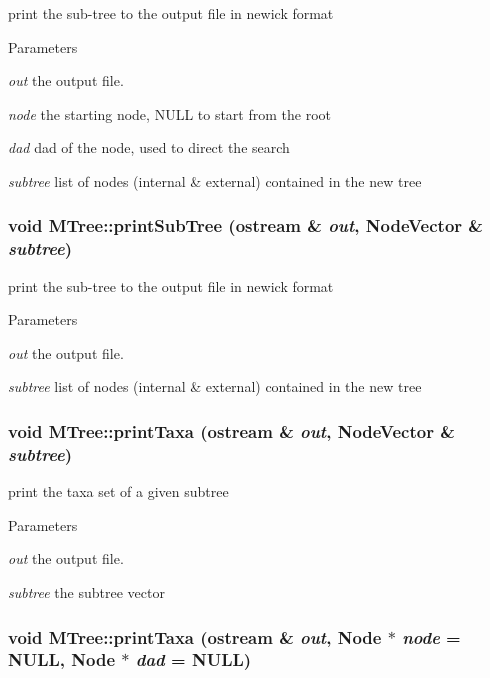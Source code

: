\label{classMTree_a898930e7052de462eac23705647762d8}
print the sub-\/tree to the output file in newick format 
\begin{DoxyParams}{Parameters}
\item[{\em out}]the output file. \item[{\em node}]the starting node, NULL to start from the root \item[{\em dad}]dad of the node, used to direct the search \item[{\em subtree}]list of nodes (internal \& external) contained in the new tree \end{DoxyParams}
\hypertarget{classMTree_ac360bb6736a82da78866093e3a58123d}{
\subsubsection[{printSubTree}]{\setlength{\rightskip}{0pt plus 5cm}void MTree::printSubTree (ostream \& {\em out}, \/  NodeVector \& {\em subtree})}}
\label{classMTree_ac360bb6736a82da78866093e3a58123d}
print the sub-\/tree to the output file in newick format 
\begin{DoxyParams}{Parameters}
\item[{\em out}]the output file. \item[{\em subtree}]list of nodes (internal \& external) contained in the new tree \end{DoxyParams}
\hypertarget{classMTree_a4c243dff35cd7214acd606ebd59f6bf4}{
\subsubsection[{printTaxa}]{\setlength{\rightskip}{0pt plus 5cm}void MTree::printTaxa (ostream \& {\em out}, \/  NodeVector \& {\em subtree})}}
\label{classMTree_a4c243dff35cd7214acd606ebd59f6bf4}
print the taxa set of a given subtree 
\begin{DoxyParams}{Parameters}
\item[{\em out}]the output file. \item[{\em subtree}]the subtree vector \end{DoxyParams}
\hypertarget{classMTree_a192b058b88470afc75cc588d8c6ebf3d}{
\subsubsection[{printTaxa}]{\setlength{\rightskip}{0pt plus 5cm}void MTree::printTaxa (ostream \& {\em out}, \/  {\bf Node} $\ast$ {\em node} = {\ttfamily NULL}, \/  {\bf Node} $\ast$ {\em dad} = {\ttfamily NULL})}}
